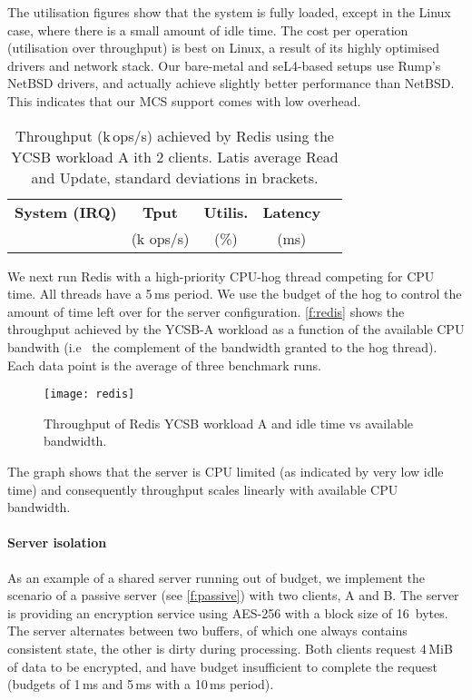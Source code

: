 The utilisation figures show that the system is fully loaded, except
in the Linux case, where there is a small amount of idle time. The
cost per operation (utilisation over throughput) is best on Linux, a
result of its highly optimised drivers and network stack. Our
bare-metal and seL4-based setups use Rump's NetBSD drivers, and
actually achieve slightly better performance than NetBSD. This
indicates that our MCS support comes with low overhead.


\begin{table}[t]\centering
      \begin{tabular}{|c|c|c|c|c|}
        \hline
        \textbf{System (IRQ)}  & \textbf{Tput} & \textbf{Utilis.} &  \textbf{Latency} \\
                               & (k ops/s)     &  (\%)            &   (ms)            \\
        \hline
      
    \end{tabular}
    \caption{Throughput (k\,ops/s) achieved by Redis using the YCSB
      workload A ith 2 clients.  Latis average Read and Update,
      standard deviations in brackets.}
    \label{t:redis}
\end{table}

We next run Redis with a high-priority CPU-hog thread competing for CPU time. All threads have a
5\,ms period. We use the budget of the hog to control the amount of time left over
for the server configuration. \autoref{f:redis} shows the throughput
achieved by the YCSB-A workload as a function of the available CPU
bandwith (i.e \ the complement of the bandwidth granted to the hog
thread). Each data point is the average of three benchmark runs.

\begin{figure}[t]
  \centering
  \texttt{[image: redis]}
  \caption{Throughput of Redis YCSB workload A and idle time vs available bandwidth.}
  \label{f:redis}
\end{figure}

The graph shows that the server is CPU limited (as indicated by very low idle time)
and consequently throughput scales linearly with available CPU
bandwidth.

\paragraph{Server isolation} As an example of a shared server running out of budget, we implement
the scenario of a passive server (see \autoref{f:passive}) with two
clients, A and B. The server is providing an encryption service using AES-256
with a block size of 16~bytes. The server alternates between two
buffers, of which one always contains consistent state, the other is
dirty during processing. Both clients request 4\,MiB of data to be encrypted, and
have budget insufficient to complete the request (budgets of 1\,ms and
5\,ms with a 10\,ms period).


